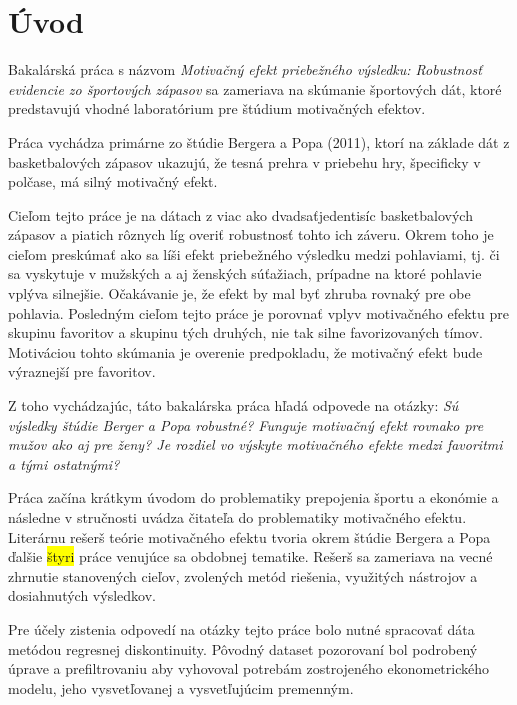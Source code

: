 \documentclass[
  digital, %
  twoside, %
  notable,   %
  lof,     %
  lot,     %
]{fithesis3}
\begin{document}
	\renewcommand{\listfigurename}{Zoznam grafov}
	\makeatletter
	\thesis@preamble %
	\makeatother
	
	\chapter*{Úvod}
	
	Bakalárská práca  s názvom \textit{Motivačný efekt priebežného výsledku: Robustnosť evidencie zo športových zápasov} sa zameriava na skúmanie športových dát, ktoré predstavujú vhodné laboratórium pre štúdium motivačných efektov.
	
	Práca vychádza primárne zo štúdie Bergera a Popa (2011), ktorí na základe dát z basketbalových zápasov ukazujú, že tesná prehra v priebehu hry, špecificky v polčase, má silný motivačný efekt. 
	
	Cieľom tejto práce je na dátach z viac ako dvadsaťjedentisíc  basketbalových zápasov a piatich rôznych líg overiť robustnosť tohto ich záveru. Okrem toho je cieľom preskúmať ako sa líši efekt priebežného výsledku medzi pohlaviami, tj. či sa vyskytuje v mužských a aj ženských súťažiach, prípadne na ktoré pohlavie vplýva silnejšie. Očakávanie je, že efekt by mal byť zhruba rovnaký pre obe pohlavia. Posledným cieľom tejto práce je porovnať vplyv motivačného efektu pre skupinu favoritov a skupinu tých druhých, nie tak silne favorizovaných tímov. Motiváciou tohto skúmania je overenie predpokladu, že motivačný efekt bude výraznejší pre favoritov.
	
	Z toho vychádzajúc, táto bakalárska práca hľadá odpovede na otázky: \textit{Sú výsledky štúdie Berger a Popa robustné? Funguje motivačný efekt rovnako pre mužov ako aj pre ženy? Je rozdiel vo výskyte motivačného efekte medzi favoritmi a tými ostatnými?} 
	
	Práca začína krátkym úvodom do problematiky prepojenia športu a ekonómie a následne v stručnosti uvádza čitateľa do problematiky  motivačného efektu. Literárnu rešerš teórie motivačného efektu tvoria okrem štúdie Bergera a Popa ďalšie \colorbox{yellow}{štyri} práce venujúce sa obdobnej tematike. Rešerš sa zameriava na vecné zhrnutie stanovených cieľov, zvolených metód riešenia, využitých nástrojov a dosiahnutých výsledkov. 
	
	Pre účely zistenia odpovedí na otázky tejto práce bolo nutné spracovať dáta metódou regresnej diskontinuity. Pôvodný dataset pozorovaní bol podrobený úprave a prefiltrovaniu aby vyhovoval potrebám zostrojeného ekonometrického modelu, jeho vysvetľovanej a vysvetľujúcim premenným.
	
\end{document}
